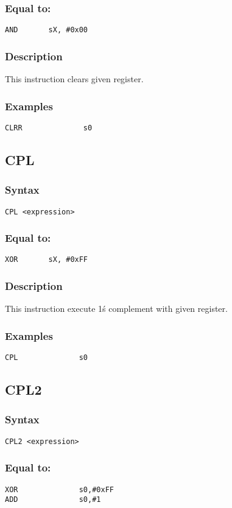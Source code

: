         \subsubsection{Equal to:}
            \verb'AND       sX, #0x00'

        \subsubsection{Description}
            This instruction clears given register.

        \subsubsection{Examples}
            \verb'CLRR              s0'

    \subsection{CPL}
        \subsubsection{Syntax}
            \verb'CPL <expression>'

        \subsubsection{Equal to:}
            \verb'XOR       sX, #0xFF'

        \subsubsection{Description}
            This instruction execute 1\'s complement with given register.

        \subsubsection{Examples}
            \verb'CPL              s0'

    \subsection{CPL2}
        \subsubsection{Syntax}
            \verb'CPL2 <expression>'

        \subsubsection{Equal to:}
            \verb'XOR              s0,#0xFF'\\
            \verb'ADD              s0,#1'

